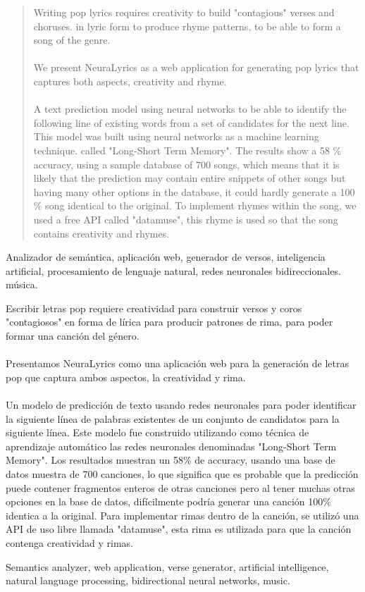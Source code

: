 \begin{abstract}
  Writing pop lyrics requires creativity to build "contagious" verses and choruses.
  in lyric form to produce rhyme patterns, to be able to form a song of the genre. \\\\
  We present NeuraLyrics as a web application for generating pop lyrics that captures
  both aspects, creativity and rhyme. \\\\
  A text prediction model using neural networks to be able to identify the following
  line of existing words from a set of candidates for the next line.
  This model was built using neural networks as a machine learning technique.
  called "Long-Short Term Memory". The results show a 58 \% accuracy,
  using a sample database of 700 songs, which means that it is likely
  that the prediction may contain entire snippets of other songs but having
  many other options in the database, it could hardly generate a 100 \% song
  identical to the original. To implement rhymes within the song, we used
  a free API called "datamuse", this rhyme is used so that the song
  contains creativity and rhymes.
  \end{abstract}

\begin{IEEEkeywords}
    Analizador de semántica, aplicación web, generador de versos,
    inteligencia artificial, procesamiento de lenguaje natural,
    redes neuronales bidireccionales. música.
\end{IEEEkeywords}

  \begin{resumen}
    Escribir letras pop requiere creatividad para construir versos y coros "contagiosos"
    en forma de lírica para producir patrones de rima, para poder formar una canción del género.\\\\
    Presentamos NeuraLyrics como una aplicación web para la generación de letras pop que captura
    ambos aspectos, la creatividad y rima.\\\\
    Un modelo de predicción de texto usando redes neuronales para poder identificar la siguiente
    línea de palabras existentes de un conjunto de candidatos para la siguiente línea.
    Este modelo fue construido utilizando como técnica de aprendizaje automático las redes neuronales
    denominadas "Long-Short Term Memory". Los resultados muestran un 58\% de accuracy,
    usando una base de datos muestra de 700 canciones, lo que significa que es probable
    que la predicción puede contener fragmentos enteros de otras canciones pero al tener
    muchas otras opciones en la base de datos, difícilmente podría generar una canción 100\%
    identica a la original. Para implementar rimas dentro de la canción, se utilizó
    una API de uso libre llamada "datamuse", esta rima es utilizada para que la canción
    contenga creatividad y rimas.
  \end{resumen}
  
  \begin{palabrasclave}    
    Semantics analyzer, web application, verse generator,
    artificial intelligence, natural language processing,
    bidirectional neural networks, music.
  \end{palabrasclave}
  